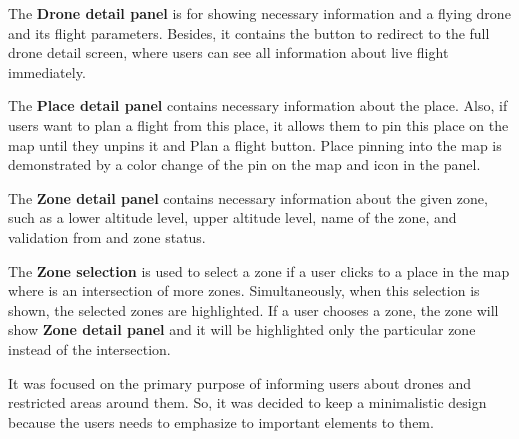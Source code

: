 The \textbf{Drone detail panel} is for showing necessary information and a flying drone and its flight parameters.
Besides, it contains the button to redirect to the full drone detail screen, where users can see all information about live flight immediately.

The \textbf{Place detail panel} contains necessary information about the place.
Also, if users want to plan a flight from this place, it allows them to pin this place on the map until they unpins it and Plan a flight button.
Place pinning into the map is demonstrated by a color change of the pin on the map and icon in the panel.

The \textbf{Zone detail panel} contains necessary information about the given zone, such as a lower altitude level, upper altitude level, name of the zone, and validation from and zone status.

The \textbf{Zone selection} is used to select a zone if a user clicks to a place in the map where is an intersection of more zones.
Simultaneously, when this selection is shown, the selected zones are highlighted.
If a user chooses a zone, the zone will show \textbf{Zone detail panel} and it will be highlighted only the particular zone instead of the intersection.

It was focused on the primary purpose of informing users about drones and restricted areas around them.
So, it was decided to keep a minimalistic design because the users needs to emphasize to important elements to them.


